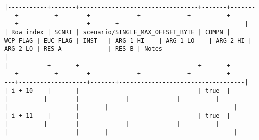 \documentclass[varwidth=\maxdimen,margin=0.5cm,multi={verbatim}]{standalone}
\begin{document}
\begin{verbatim}
|-----------+-------+---------------------------------+-------+----------+----------+--------+-------------+-------------+----------+----------+-------------------+-------+-----------------------------------|
| Row index | SCNRI | scenario/SINGLE_MAX_OFFSET_BYTE | COMPN | WCP_FLAG | EUC_FLAG | INST   | ARG_1_HI    | ARG_1_LO    | ARG_2_HI | ARG_2_LO | RES_A             | RES_B | Notes                             |
|-----------+-------+---------------------------------+-------+----------+----------+--------+-------------+-------------+----------+----------+-------------------+-------+-----------------------------------|
| i + 10    |       |                                 | true  |          |          |        |             |             |          |          |                   |       |                                   |
| i + 11    |       |                                 | true  |          |          |        |             |             |          |          |                   |       |                                   |

\end{verbatim}
\end{document}
